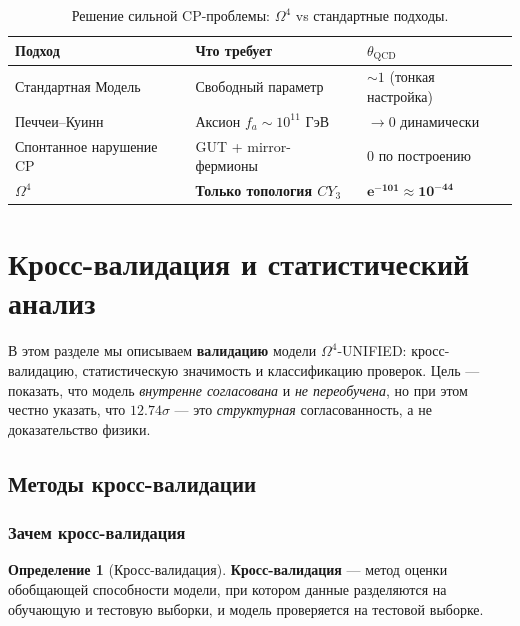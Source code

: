 \documentclass[11pt,a4paper]{article}
\newcommand{\CY}{\ensuremath{CY_3}}
\newcommand{\Om}{\ensuremath{\Omega^4}}
\theoremstyle{definition}
\newtheorem{definition}[theorem]{Определение}
\begin{document}
\begin{table}[htbp]
\centering
\caption{Решение сильной CP-проблемы: \texorpdfstring{$\Om$}{} vs стандартные подходы.}
\label{tab:strong-cp-comparison}
\begin{tabular}{p{3cm}p{4cm}p{4cm}}
\toprule
Подход & Что требует & $\theta_{\text{QCD}}$ \\
\midrule
Стандартная Модель & Свободный параметр & $\sim 1$ (тонкая настройка) \\
Печчеи--Куинн & Аксион $f_a \sim 10^{11}$ ГэВ & $\to 0$ динамически \\
Спонтанное нарушение CP & GUT + mirror-фермионы & $0$ по построению \\
\textbf{$\Om$} & \textbf{Только топология $\CY$} & $\boldsymbol{e^{-101} \approx 10^{-44}}$ \\
\bottomrule
\end{tabular}
\end{table}
\section{Кросс-валидация и статистический анализ}
\label{sec:validation}

В этом разделе мы описываем \textbf{валидацию} модели $\Om$-UNIFIED:
кросс-валидацию, статистическую значимость и классификацию проверок.
Цель --- показать, что модель \emph{внутренне согласована}
и \emph{не переобучена}, но при этом честно указать, что
$12.74\sigma$ — это \emph{структурная} согласованность,
а не доказательство физики.

\subsection{Методы кросс-валидации}
\label{subsec:cv-methods}

\subsubsection{Зачем кросс-валидация}

\begin{definition}[Кросс-валидация]
\label{def:cross-validation}
\textbf{Кросс-валидация} --- метод оценки обобщающей способности
модели, при котором данные разделяются на обучающую и тестовую
выборки, и модель проверяется на тестовой выборке.
\end{definition}
\end{document}
